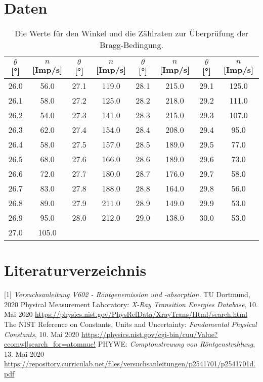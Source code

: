 \documentclass[titlepage = firstcover]{scrartcl}
\begin{document}
    \section{Daten}
      \begin{table}[h]
        \centering
        \caption{Die Werte für den Winkel und die Zählraten zur Überprüfung der Bragg-Bedingung.}
        \label{tab:bragg}
        \begin{tabular}{c c c c c c c c}
          \toprule
          $\theta$ [°] & $n$ [Imp/s] & $\theta$ [°] & $n$ [Imp/s] & $\theta$ [°] & $n$ [Imp/s] & $\theta$ [°] & $n$ [Imp/s] \\
          \midrule                                                         
            26.0 & 56.0  & 27.1 & 119.0 & 28.1 & 215.0 & 29.1 & 125.0\\
            26.1 & 58.0  & 27.2 & 125.0 & 28.2 & 218.0 & 29.2 & 111.0\\
            26.2 & 54.0  & 27.3 & 141.0 & 28.3 & 215.0 & 29.3 & 107.0\\
            26.3 & 62.0  & 27.4 & 154.0 & 28.4 & 208.0 & 29.4 & 95.0 \\
            26.4 & 58.0  & 27.5 & 157.0 & 28.5 & 189.0 & 29.5 & 77.0 \\
            26.5 & 68.0  & 27.6 & 166.0 & 28.6 & 189.0 & 29.6 & 73.0 \\
            26.6 & 72.0  & 27.7 & 180.0 & 28.7 & 176.0 & 29.7 & 58.0 \\
            26.7 & 83.0  & 27.8 & 188.0 & 28.8 & 164.0 & 29.8 & 56.0 \\
            26.8 & 89.0  & 27.9 & 211.0 & 28.9 & 149.0 & 29.9 & 53.0 \\
            26.9 & 95.0  & 28.0 & 212.0 & 29.0 & 138.0 & 30.0 & 53.0 \\
            27.0 & 105.0 \\
          \bottomrule
        \end{tabular}
      \end{table}
      \FloatBarrier

    \newpage
    \section{Literaturverzeichnis}
    [1] \textit{Versuchsanleitung V602 - Röntgenemission und -absorption.} TU Dortmund, 2020 \newline
    [2] Physical Measurement Laboratory: \textit{X-Ray Transition Energies Database}, 10. Mai 2020
    \url{https://physics.nist.gov/PhysRefData/XrayTrans/Html/search.html} \newline
    [3] The NIST Reference on Constants, Units and Uncertainty: \textit{Fundamental Physical Constants}, 10. Mai 2020
    \url{https://physics.nist.gov/cgi-bin/cuu/Value?ecomwl|search_for=atomnuc!} \newline
    [4] PHYWE: \textit{Comptonstreuung von Röntgenstrahlung}, 13. Mai 2020
    \url{https://repository.curriculab.net/files/versuchsanleitungen/p2541701/p2541701d.pdf}
\end{document}
